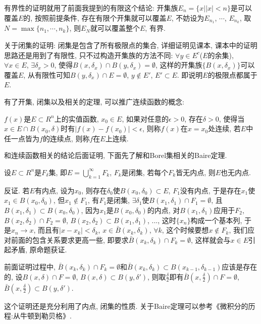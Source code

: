 \documentclass[12pt,a4paper,openany]{book}
\begin{document}
有界性的证明就用了前面我提到的有限这个结论: 开集族$E_n = \{ x | |x| < n\}$是可以覆盖$E$的, 按照前提条件, 存在有限个开集就可以覆盖$E$, 不妨设为$E_{n_1}$, $\cdots$, $E_{n_k}$, 取$N = \max\{n_1, \cdots, n_k\}$, 则$E_N$就可以覆盖整个$E$, 有界.

关于闭集的证明: 闭集是包含了所有极限点的集合, 详细证明见课本, 课本中的证明思路还是用到了有限性, 只不过构造开集族的方法不同: $\forall y \in E^c$($E$的余集), $\forall x \in E$, $\exists \delta_x > 0$, 使得$B(x, \delta_x) \cap B(y, \delta_x) = \emptyset$, 这样的开集族$\{B(x, \delta_x)\}$可以覆盖$E$, 从有限性可知$B(y, \delta_x) \cap E = \emptyset$, $y \notin E'$, $E' \subset E$. 即说明$E$的极限点都属于$E$.

有了开集, 闭集以及相关的定理, 可以推广连续函数的概念:

$f(x)$是$E \subset R^n$上的实值函数, $x_0 \in E$, 如果对任意的$\epsilon > 0$, 存在$\delta > 0$, 使得当$x \in E \cap B(x_0, \delta)$时有$|f(x) - f(x_0)| < \epsilon$, 则称$f(x)$在$x = x_0$处连续, 若$E$中任一点皆为$f$的连续点, 则称$f$在$E$上连续.

和连续函数相关的结论后面证明, 下面先了解和Borel集相关的Baire定理.

设$E \subset R^n$是$F_{\delta}$集, 即$E = \bigcup\limits_{k=1}^{\infty}{F_k}$, $F_k$是闭集, 若每个$F_k$皆无内点, 则$E$也无内点.

反证. 若$E$有内点, 设为$x_0$, 则存在$\delta_0$使$B(x_0, \delta_0) \subset E$, $F_1$没有内点, 于是存在$x_1$使$x_1 \in B(x_0, \delta_0)$, 但$x_1 \notin F_1$, 有$F_1$是闭集, $\exists \delta_1$使$B(x_1, \delta_1) \cap F_1 = \emptyset$, 且$B(x_1, \delta_1) \subset B(x_0, \delta_0)$, 因为$x_1$是$B(x_0, \delta_0)$的内点, 对$B(x_1, \delta_1)$应用于$F_2$, $B(x_2,\delta_2) \cap F_2 = \emptyset$, $B(x_2, \delta_2) \subset B(x_1, \delta_1)$, ..., 这时$\{x_n\}$构成一个基本列, 于是$x_n \rightarrow x$, 而且有$|x - x_k| < \delta_k$, $x \in \bar{B}(x_k, \delta_k)$, $\forall k$, 这个时候要想$x \notin F_k$, 我们应对前面的包含关系要求更高一些, 即要求$\bar{B}(x_k, \delta_k) \cap F_k = \emptyset$, 这样就会与$x \in E$引起矛盾, 原命题获证.

前面证明过程中, $\bar{B}(x_k, \delta_k) \cap F_k = \emptyset$和$\bar{B}(x_k, \delta_k) \subset B(x_{k-1}, \delta_{k-1})$应该是存在的, 设$B(x, \delta) \cap F = \emptyset$, $B(x, \delta) \subset B(y, \delta')$, 则取$\frac{\delta}{2}$即有$\bar{B}(x, \frac{\delta}{2}) \cap F = \emptyset$, $\bar{B}(x, \frac{\delta}{2}) \subset B(y, \delta')$.

这个证明还是充分利用了内点, 闭集的性质. 关于Baire定理可以参考《微积分的历程:从牛顿到勒贝格》.
\end{document}
